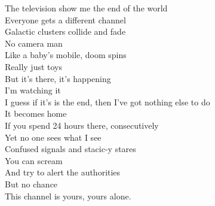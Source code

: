 The television show me the end of the world\\
Everyone gets a different channel\\
Galactic clusters collide and fade\\
No camera man\\
Like a baby's mobile, doom spins\\
Really just toys\\
But it's there, it's happening\\
I'm watching it\\
I guess if it's is the end, then I've got nothing else to do\\
It becomes home\\
If you spend 24 hours there, consecutively\\
Yet no one sees what I see\\
Confused signals and stacic-y stares\\
You can scream\\
And try to alert the authorities\\
But no chance\\
This channel is yours, yours alone.\\


